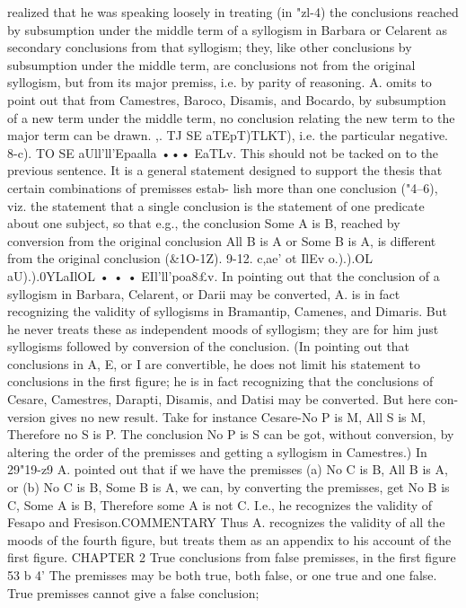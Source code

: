 realized that he was speaking loosely in treating (in "zl-4) the
conclusions reached by subsumption under the middle term of a
syllogism in Barbara or Celarent as secondary conclusions from
that syllogism; they, like other conclusions by subsumption under
the middle term, are conclusions not from the original syllogism,
but from its major premiss, i.e. by parity of reasoning.
A. omits to point out that from Camestres, Baroco, Disamis,
and Bocardo, by subsumption of a new term under the middle
term, no conclusion relating the new term to the major term can
be drawn.
,. TJ SE aTEpT)TLKT), i.e. the particular negative.
8-c). TO SE aUll'll'Epaalla ••• EaTLv. This should not be tacked
on to the previous sentence. It is a general statement designed to
support the thesis that certain combinations of premisses estab-
lish more than one conclusion ("4--6), viz. the statement that a
single conclusion is the statement of one predicate about one
subject, so that e.g., the conclusion Some A is B, reached by
conversion from the original conclusion All B is A or Some B is A,
is different from the original conclusion (&1O-1Z).
9-12. c,ae' ot IlEv o.).).OL aU).).0YLaIlOL • • • EIl'll'poa8£v. In
pointing out that the conclusion of a syllogism in Barbara,
Celarent, or Darii may be converted, A. is in fact recognizing the
validity of syllogisms in Bramantip, Camenes, and Dimaris. But
he never treats these as independent moods of syllogism; they are
for him just syllogisms followed by conversion of the conclusion.
(In pointing out that conclusions in A, E, or I are convertible,
he does not limit his statement to conclusions in the first figure;
he is in fact recognizing that the conclusions of Cesare, Camestres,
Darapti, Disamis, and Datisi may be converted. But here con-
version gives no new result. Take for instance Cesare-No P is
M, All S is M, Therefore no S is P. The conclusion No P is S can
be got, without conversion, by altering the order of the premisses
and getting a syllogism in Camestres.)
In 29"19-z9 A. pointed out that if we have the premisses (a) No
C is B, All B is A, or (b) No C is B, Some B is A, we can, by
converting the premisses, get No B is C, Some A is B, Therefore
some A is not C. I.e., he recognizes the validity of Fesapo and
Fresison.COMMENTARY
Thus A. recognizes the validity of all the moods of the fourth
figure, but treats them as an appendix to his account of the first
figure.
CHAPTER 2
True conclusions from false premisses, in the first figure
53 b 4' The premisses may be both true, both false, or one true
and one false. True premisses cannot give a false conclusion;
